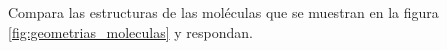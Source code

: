 \question Compara las estructuras de las moléculas que se muestran en la figura \ref{fig:geometrias_moleculas} y respondan.

\begin{parts}
    
    
\end{parts}

